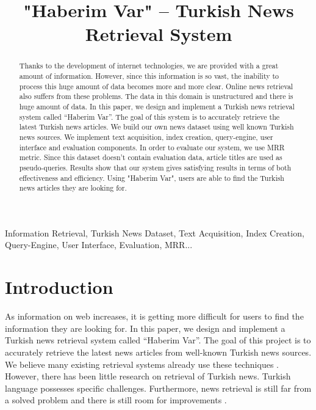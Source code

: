 \documentclass[conference]{IEEEtran}
\begin{document}
\title{"Haberim Var" – Turkish News Retrieval System}
\author{
}

\maketitle

\begin{abstract}
Thanks to the development of internet technologies, we are provided with a great amount of information. However, since this information is so vast, the inability to process this huge amount of data becomes more and more clear. Online news retrieval also suffers from these problems. The data in this domain is unstructured and there is huge amount of data. In this paper, we design and implement a Turkish news retrieval system called “Haberim Var”. The goal of this system is to accurately retrieve the latest Turkish news articles. We build our own news dataset using well known Turkish news sources. We implement text acquisition, index creation, query-engine, user interface and evaluation components. In order to evaluate our system, we use MRR metric. Since this dataset doesn't contain evaluation data, article titles are used as pseudo-queries. Results show that our system gives satisfying results in terms of both effectiveness and efficiency. Using "Haberim Var", users are able to find the Turkish news articles they are looking for.
\end{abstract}

\begin{IEEEkeywords}
Information Retrieval, Turkish News Dataset, Text Acquisition, Index Creation, Query-Engine, User Interface, Evaluation, MRR...
\end{IEEEkeywords}

\section{Introduction}
As information on web increases, it is getting more difficult for users to find the information they are looking for. In this paper, we design and implement a Turkish news retrieval system called “Haberim Var”. The goal of this project is to accurately retrieve the latest news articles from well-known Turkish news sources. We believe many existing retrieval systems already use these techniques \cite{irbook}. However, there has been little research on retrieval of Turkish news. Turkish language possesses specific challenges. Furthermore, news retrieval is still far from a solved problem and there is still room for improvements \cite{newsir16}.
\end{document}
